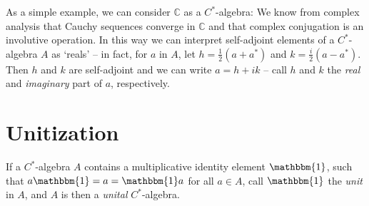 \documentclass[11pt,a4paper]{report}
\theoremstyle{plain}
\theoremstyle{definition}
\newcommand{\1}{\mathbbm{1}}
\newcommand{\C}{\mathbb{C}}
\begin{document}
As a simple example, we can consider $\C$ as a $C^\ast$-algebra: We know from 
complex analysis that Cauchy sequences converge in $\C$ and that complex 
conjugation is an involutive operation. In this way we can interpret 
self-adjoint elements of a $C^\ast$-algebra $A$ as `reals' -- in fact, for $a$ 
in $A$, let $h=\tfrac{1}{2}(a+a^\ast)$ and $k=\tfrac{i}{2}(a-a^\ast)$. Then $h$ 
and $k$ are self-adjoint and we can write $a=h+ik$ -- call $h$ and $k$ the 
\emph{real} and \emph{imaginary} part of $a$, respectively. 

\section{Unitization}
If a $C^\ast$-algebra $A$ contains a multiplicative identity element $\1$, such 
that $a \1 = a = \1  a$ for all $a \in A$, call $\1$ the \emph{unit} in $A$, and 
$A$ is then a \emph{unital} $C^\ast$-algebra.
\end{document}
